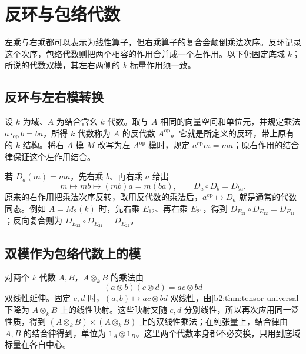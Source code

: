 
\section{反环与包络代数}
\label{b2:sec:1102}

左乘与右乘都可以表示为线性算子，但右乘算子的复合会颠倒乘法次序。反环记录这个次序，包络代数则把两个相容的作用合并成一个左作用。以下仍固定底域 \(k\)；所说的代数双模，其左右两侧的 \(k\) 标量作用须一致。

%
%

\subsection{反环与左右模转换}
\label{b2:subsec:1102:01}

设 \(k\) 为域、\(A\) 为结合含幺 \(k\) 代数。取与 \(A\) 相同的向量空间和单位元，并规定乘法 \(a\cdot_{\mathrm{op}}b=ba\)，所得 \(k\) 代数称为 \(A\) 的反代数 \(A^{\mathrm{op}}\)。它就是所定义的反环，带上原有的 \(k\) 结构。将右 \(A\) 模 \(M\) 改写为左 \(A^{\mathrm{op}}\) 模时，规定 \(a^{\mathrm{op}}m=ma\)；原右作用的结合律保证这个左作用结合。

\ProseParagraphBreak
若 \(D_a(m)=ma\)，先右乘 \(b\)、再右乘 \(a\) 给出
\[
	m\longmapsto mb\longmapsto(mb)a=m(ba), \qquad D_a\circ D_b=D_{ba}.
\]
原来的右作用把乘法次序反转，改用反代数的乘法后，\(a^{\mathrm{op}}\mapsto D_a\) 就是通常的代数同态。例如 \(A=M_2(k)\) 时，先右乘 \(E_{12}\)、再右乘 \(E_{21}\)，得到 \(D_{E_{21}}\circ D_{E_{12}}=D_{E_{11}}\)；反向复合则为 \(D_{E_{12}}\circ D_{E_{21}}=D_{E_{22}}\)。

\subsection{双模作为包络代数上的模}
\label{b2:subsec:1102:02}

对两个 \(k\) 代数 \(A,B\)，\(A\otimes_kB\) 的乘法由
\[
	(a\otimes b)(c\otimes d)=ac\otimes bd
\]
双线性延伸。固定 \(c,d\) 时，\((a,b)\mapsto ac\otimes bd\) 双线性，由\cref{b2:thm:tensor-universal}下降为 \(A\otimes_kB\) 上的线性映射。这些映射又随 \(c,d\) 分别线性，所以再次应用同一泛性质，得到 \((A\otimes_kB)\times(A\otimes_kB)\) 上的双线性乘法；在纯张量上，结合律由 \(A,B\) 的结合律得到，单位为 \(1_A\otimes1_B\)。这里两个代数本身都不必交换，只用到底域标量在各自中心。

